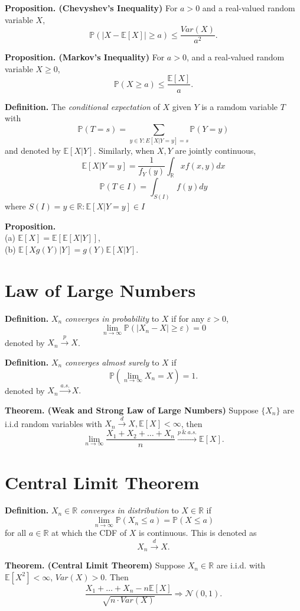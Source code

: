 \documentclass{article}[11pt]
\begin{document}
\textbf{Proposition. (Chevyshev's Inequality)} For $a > 0$ and a real-valued random variable $X$,
$$\mathbb{P}(| X - \mathbb{E}[X]| \geq a) \leq \frac{Var(X)}{a^2}.$$

\textbf{Proposition. (Markov's Inequality)} For $a > 0$, and a real-valued random variable $X \geq 0$,
$$\mathbb{P}(X \geq a) \leq \frac{\mathbb{E}[X]}{a}.$$

\textbf{Definition.} The \emph{conditional expectation} of $X$ given $Y$ is a ramdom variable $T$ with
\[
  \mathbb{P}(T = s) = \sum_{y \in Y: E[X|Y = y] = s} \mathbb{P}(Y=y)  
\]
and denoted by $\mathbb{E}[X|Y].$ Similarly, when $X,Y$ are jointly continuous,
$$\mathbb{E}[X|Y=y] = \frac{1}{f_Y(y)}\int_{\mathbb{R}}xf(x,y)dx$$
\[
  \mathbb{P}(T\in I) = \int_{S(I)}f(y)dy
\]
where $S(I) = {y\in \mathbb{R}: \mathbb{E}}[X|Y = y] \in I$

\textbf{Proposition.} \\
(a) $\mathbb{E}[X] = \mathbb{E}[\mathbb{E}[X|Y]]$, \\
(b) $\mathbb{E}[Xg(Y)|Y] = g(Y)\mathbb{E}[X|Y]$.
\section{Law of Large Numbers}

\textbf{Definition.} $X_n$ \emph{converges in probability} to $X$ if
                     for any $\varepsilon > 0$,
                     $$\lim_{n \to \infty}\mathbb{P}(|X_n-X| \geq \varepsilon) = 0 $$
                     denoted by $X_n \xrightarrow{p} X $.

\par

\textbf{Definition.} $X_n$ \emph{converges almost surely} to $X$ if 
                     $$\mathbb{P}(\lim_{n \to \infty}X_n = X) = 1.$$
                     denoted by $X_n \xrightarrow{a.s.} X.$

\textbf{Theorem. (Weak and Strong Law of Large Numbers)} Suppose $\{X_n\}$ are i.i.d random variables with $X_n \xrightarrow{d} X, \mathbb{E}[X] < \infty$, then
$$\lim_{n \to \infty}\frac{X_1 + X_2 + \dots +X_n}{n} \xrightarrow{p \ \& \ a.s.} \mathbb{E}[X].$$



\section{Central Limit Theorem}

\textbf{Definition.} $X_n\in \mathbb{R}$ \emph{converges in distribution} to $X \in \mathbb{R}$ if
                     $$\lim_{n \to \infty}\mathbb{P}(X_n \leq a) = \mathbb{P}(X \leq a)$$
                     for all $a \in \mathbb{R}$ at which the CDF of $X$ is continuous. This is denoted as $$X_n \xrightarrow{d} X.$$

                     \textbf{Theorem. (Central Limit Theorem)} Suppose $X_n \in \mathbb{R}$ are i.i.d. with $\mathbb{E}[X^2] < \infty$, $Var(X) > 0$. Then
                     $$\frac{X_1+\dots+X_n - n\mathbb{E}[X]}{\sqrt{n\cdot Var(X)}} \Rightarrow \mathcal{N}(0,1).$$
\end{document}

